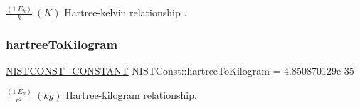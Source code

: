 $\frac{(1\ E_h)}{k} \ (K)$ Hartree-\/kelvin relationship . \mbox{\label{group___n_i_s_t_const-_hartree_ga61c0da502aec40e97aaa90bbbaf8afb2}} 
\subsubsection{\texorpdfstring{hartree\+To\+Kilogram}{hartreeToKilogram}}
{\footnotesize\ttfamily \mbox{\hyperlink{group___n_i_s_t_const-_macros_ga2b0fc1d7452373f816175dd86ce26729}{N\+I\+S\+T\+C\+O\+N\+S\+T\+\_\+\+C\+O\+N\+S\+T\+A\+NT}} N\+I\+S\+T\+Const\+::hartree\+To\+Kilogram = 4.\+850870129e-\/35}

$\frac{(1\ E_h)}{c^2} \ (kg)$ Hartree-\/kilogram relationship. 
